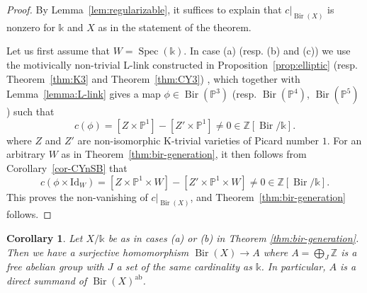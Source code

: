 \documentclass[a4paper,12pt]{amsart}
\def\k{\mathbb k}
\def\P{\mathbb P}
\def\Z{\mathbb Z}
\def\Spec{{\operatorname{Spec}}}
\def\Bir{{\operatorname{Bir}}}
\def\Id{{\mathrm{Id}}}
\def\ab{{\mathrm{ab}}}
\theoremstyle{plain}
\newtheorem{corollary}[dummy]{Corollary}
\numberwithin{equation}{section}
\theoremstyle{definition}
\renewcommand{\(}{\left(}
\renewcommand{\)}{\right)}
\begin{document}
\begin{proof}
By Lemma~\ref{lem:regularizable}, 
it suffices
to explain that $c|_{\Bir(X)}$ is nonzero
for $\k$ and $X$ as in
the statement of the theorem.

Let us first assume that $W = \Spec(\k)$.
In case (a) (resp. (b) and (c)) we 
use the motivically non-trivial L-link constructed in Proposition~\ref{prop:elliptic} 
(resp. Theorem~\ref{thm:K3} and Theorem~\ref{thm:CY3}) ,
which together with 
Lemma~\ref{lemma:L-link} gives a map $\phi \in \Bir(\P^3)$
(resp. $\Bir(\P^4)$, $\Bir(\P^5)$)
such that 
$$c(\phi) = [Z \times \P^1] - [Z' \times \P^1] \ne 0 \in \Z[\Bir/\k].$$
where $Z$ and $Z'$ are non-isomorphic
K-trivial
varieties of Picard number $1$.
For an arbitrary $W$ as in Theorem~\ref{thm:bir-generation},
it then follows from Corollary~\ref{cor-CYnSB}
that
$$c(\phi \times \Id_W) = [Z \times \P^1 \times W] - [Z' \times \P^1 \times W] 
\ne 0 \in \Z[\Bir/\k].$$
This proves the non-vanishing of $c|_{\Bir(X)}$, and Theorem~\ref{thm:bir-generation} follows.
\end{proof}




\begin{corollary}\label{cor:homZ}
Let $X/\k$ be as in cases (a) or (b) in Theorem \ref{thm:bir-generation}.
Then we have a surjective homomorphism
$
\Bir(X) \to A
$
where $A = \bigoplus_J \Z$
is a free abelian group
with $J$ a set 
of the same cardinality as $\k$.
In particular, $A$ is a direct summand
of $\Bir(X)^{\ab}$.
\end{corollary}
\end{document}
